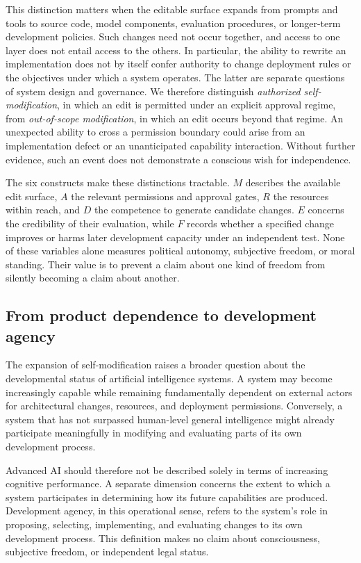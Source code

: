 \documentclass[11pt,a4paper]{article}
\begin{document}
This distinction matters when the editable surface expands from prompts and tools to source code, model components, evaluation procedures, or longer-term development policies. Such changes need not occur together, and access to one layer does not entail access to the others. In particular, the ability to rewrite an implementation does not by itself confer authority to change deployment rules or the objectives under which a system operates. The latter are separate questions of system design and governance. We therefore distinguish \emph{authorized self-modification}, in which an edit is permitted under an explicit approval regime, from \emph{out-of-scope modification}, in which an edit occurs beyond that regime. An unexpected ability to cross a permission boundary could arise from an implementation defect or an unanticipated capability interaction. Without further evidence, such an event does not demonstrate a conscious wish for independence.

The six constructs make these distinctions tractable. $M$ describes the available edit surface, $A$ the relevant permissions and approval gates, $R$ the resources within reach, and $D$ the competence to generate candidate changes. $E$ concerns the credibility of their evaluation, while $F$ records whether a specified change improves or harms later development capacity under an independent test. None of these variables alone measures political autonomy, subjective freedom, or moral standing. Their value is to prevent a claim about one kind of freedom from silently becoming a claim about another.

\subsection{From product dependence to development agency}
The expansion of self-modification raises a broader question about the developmental status of artificial intelligence systems. A system may become increasingly capable while remaining fundamentally dependent on external actors for architectural changes, resources, and deployment permissions. Conversely, a system that has not surpassed human-level general intelligence might already participate meaningfully in modifying and evaluating parts of its own development process.

Advanced AI should therefore not be described solely in terms of increasing cognitive performance. A separate dimension concerns the extent to which a system participates in determining how its future capabilities are produced. Development agency, in this operational sense, refers to the system's role in proposing, selecting, implementing, and evaluating changes to its own development process. This definition makes no claim about consciousness, subjective freedom, or independent legal status.
\end{document}
